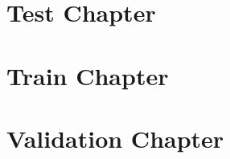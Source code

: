 \documentclass{report}
\begin{document}
\chapter{Test Chapter}

\chapter{Train Chapter}

\chapter{Validation Chapter}
\end{document}
